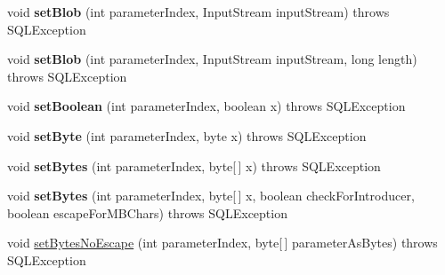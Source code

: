 \begin{DoxyCompactItemize}
\item 
\mbox{\label{classcom_1_1mysql_1_1cj_1_1jdbc_1_1_client_prepared_statement_ad19cc4ca302d112eba0ead88a37e4357}} 
void {\bfseries set\+Blob} (int parameter\+Index, Input\+Stream input\+Stream)  throws S\+Q\+L\+Exception 
\item 
\mbox{\label{classcom_1_1mysql_1_1cj_1_1jdbc_1_1_client_prepared_statement_a43750d9f82655361a63c4755ff0113bd}} 
void {\bfseries set\+Blob} (int parameter\+Index, Input\+Stream input\+Stream, long length)  throws S\+Q\+L\+Exception 
\item 
\mbox{\label{classcom_1_1mysql_1_1cj_1_1jdbc_1_1_client_prepared_statement_aff14b242a73b51061bae28bce07747c8}} 
void {\bfseries set\+Boolean} (int parameter\+Index, boolean x)  throws S\+Q\+L\+Exception 
\item 
\mbox{\label{classcom_1_1mysql_1_1cj_1_1jdbc_1_1_client_prepared_statement_ab19c3165f63658984b938f1b58a2addd}} 
void {\bfseries set\+Byte} (int parameter\+Index, byte x)  throws S\+Q\+L\+Exception 
\item 
\mbox{\label{classcom_1_1mysql_1_1cj_1_1jdbc_1_1_client_prepared_statement_af5c3e969b12901953490898fa6346ad6}} 
void {\bfseries set\+Bytes} (int parameter\+Index, byte\mbox{[}$\,$\mbox{]} x)  throws S\+Q\+L\+Exception 
\item 
\mbox{\label{classcom_1_1mysql_1_1cj_1_1jdbc_1_1_client_prepared_statement_ae32665d789135291c132d6f7cff0d136}} 
void {\bfseries set\+Bytes} (int parameter\+Index, byte\mbox{[}$\,$\mbox{]} x, boolean check\+For\+Introducer, boolean escape\+For\+M\+B\+Chars)  throws S\+Q\+L\+Exception 
\item 
void \mbox{\hyperlink{classcom_1_1mysql_1_1cj_1_1jdbc_1_1_client_prepared_statement_a7db4bf1c51418004ea1482b72d2c7913}{set\+Bytes\+No\+Escape}} (int parameter\+Index, byte\mbox{[}$\,$\mbox{]} parameter\+As\+Bytes)  throws S\+Q\+L\+Exception 
\item 

\end{DoxyCompactItemize}
